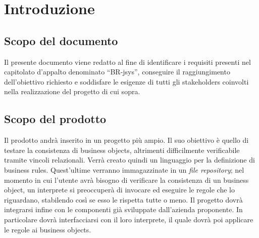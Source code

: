 \documentclass[11pt,titlepage,a4paper]{report}
\begin{document}
\tableofcontents

\chapter{Introduzione}
\section{Scopo del documento}
Il presente documento viene redatto al fine di identificare i requisiti presenti nel capitolato d'appalto denominato ``BR-jsys'', conseguire il raggiungimento dell'obiettivo richiesto e soddisfare le esigenze di tutti gli stakeholders coinvolti nella realizzazione del progetto di cui sopra.
\section{Scopo del prodotto}
Il prodotto andr\`a inserito in un progetto pi\`u ampio. Il suo obiettivo \`e quello di testare la consistenza di business objects, altrimenti difficilmente verificabile tramite vincoli relazionali.
Verr\`a creato quindi un linguaggio per la definizione di business rules. Quest'ultime verranno immagazzinate in un \textit{file repository}; nel momento in cui l'utente avr\`a bisogno di verificare la consistenza di un business object, un interprete si preoccuper\`a di invocare ed eseguire le regole che lo riguardano, stabilendo cos\`i se esso le rispetta tutte o meno.
Il progetto dovr\`a integrarsi infine con le componenti gi\`a sviluppate dall'azienda proponente. In particolare dovr\`a interfacciarsi con il loro interprete, il quale dovr\`a poi applicare le regole ai business objects.
\end{document}
